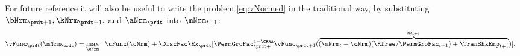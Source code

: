 \documentclass[\econtexRoot/SolvingMicroDSOPs]{subfiles}
\begin{document}
For future reference it will also be useful to write the problem \eqref{eq:vNormed} in the traditional way, by substituting $\bNrm_{\prdt+1},{\kNrm}_{\prdt+1},$ and $\aNrm_{\prdt}$ into $\mNrm_{t+1}$:
\begin{equation}\begin{gathered}\begin{aligned}
      \vFunc_{\prdt}(\mNrm_{\prdt}) & = \max_{\cNrm} ~~ \uFunc(\cNrm)+ \DiscFac \Ex_{\prdt}[ \PermGroFac_{\prdt+1}^{1-\CRRA}\vFunc_{\prdt+1}(\overbrace{(\mNrm_{t}-\cNrm)(\Rfree/\PermGroFac_{t+1})+\TranShkEmp_{t+1}}^{m_{t+1}})] \label{eq:vusual}.
    \end{aligned}\end{gathered}\end{equation}
\end{document}
